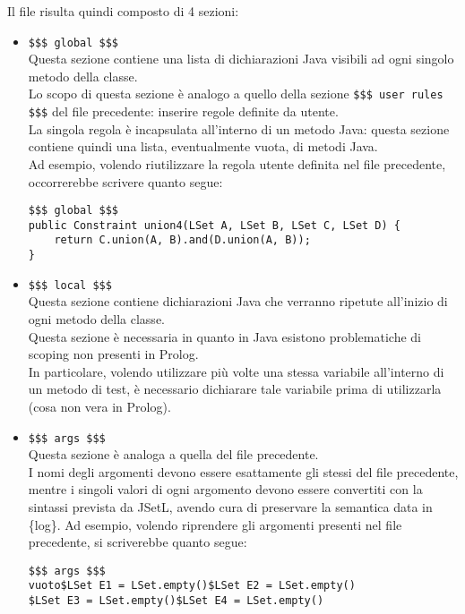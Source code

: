 Il file risulta quindi composto di 4 sezioni:\\
\begin{itemize}
\item \texttt{\$\$\$ global \$\$\$} \\
Questa sezione contiene una lista di dichiarazioni Java visibili ad ogni singolo metodo della classe.\\
Lo scopo di questa sezione è analogo a quello della sezione \texttt{\$\$\$ user rules \$\$\$} del file precedente: inserire regole definite da utente.\\
La singola regola è incapsulata all'interno di un metodo Java: questa sezione contiene quindi una lista, eventualmente vuota, di metodi Java.\\
Ad esempio, volendo riutilizzare la regola utente definita nel file precedente, occorrerebbe scrivere quanto segue:\\

\begin{lstlisting}
$$$ global $$$
public Constraint union4(LSet A, LSet B, LSet C, LSet D) {
    return C.union(A, B).and(D.union(A, B));
}
\end{lstlisting}

\item \texttt{\$\$\$ local \$\$\$} \\
Questa sezione contiene dichiarazioni Java che verranno ripetute all'inizio di ogni metodo della classe.\\
Questa sezione è necessaria in quanto in Java esistono problematiche di scoping non presenti in Prolog.\\
In particolare, volendo utilizzare più volte una stessa variabile all'interno di un metodo di test, è necessario dichiarare tale variabile prima di utilizzarla (cosa non vera in Prolog).\\

\item \texttt{\$\$\$ args \$\$\$} \\
Questa sezione è analoga a quella del file precedente.\\
I nomi degli argomenti devono essere esattamente gli stessi del file precedente, mentre i singoli valori di ogni argomento devono essere convertiti con la sintassi prevista da JSetL, avendo cura di preservare la semantica data in \{log\}. Ad esempio, volendo riprendere gli argomenti presenti nel file precedente, si scriverebbe quanto segue:\\
\begin{lstlisting}
$$$ args $$$
vuoto$LSet E1 = LSet.empty()$LSet E2 = LSet.empty()
$LSet E3 = LSet.empty()$LSet E4 = LSet.empty()


\end{lstlisting}
\end{itemize}
